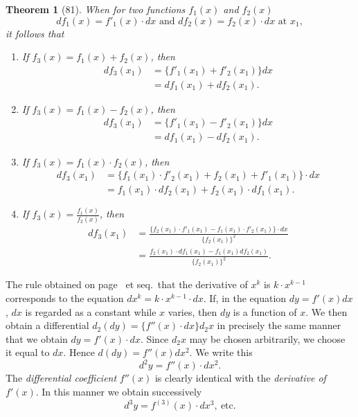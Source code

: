 \documentclass[a4paper,12pt]{book}[2004/02/16]
\providecommand{\hypertarget}[2]{#2}
\theoremstyle{ilemma}
\theoremstyle{itheorem}
\newtheorem{theorem}{Theorem}
\theoremstyle{iother}
\theoremstyle{icorollary}
\theoremstyle{numcorollary}
\theoremstyle{idefinition}
\renewcommand{\dfrac}[2]{\frac{#1}{#2}}%
\begin{document}
\begin{theorem}[81]\hypertarget{thm81}{}
When for two functions $f_1(x)$ and $f_2(x)$
\[
  df_1(x)=f'_1(x)\cdot dx\text{ and }df_2(x)=f_2(x)\cdot dx\text{ at }x_1,
\]
it follows that
\begin{enumerate}
\item[\textnormal{(\textit{a})}] If $f_3(x)=f_1(x)+f_2(x)$, then
\begin{align*}
  df_3(x_1)&=\{f'_1(x_1)+f'_2(x_1)\}dx \\
  &= df_1(x_1)+df_2(x_1).
\end{align*}
\item[\textnormal{(\textit{b})}] If $f_3(x)=f_1(x)-f_2(x)$, then
\begin{align*}
  df_3(x_1)&=\{f'_1(x_1)-f'_2(x_1)\}dx \\
  &= df_1(x_1)-df_2(x_1).
\end{align*}
\item[\textnormal{(\textit{c})}] If $f_3(x)=f_1(x) \cdot f_2(x)$, then
\begin{align*}
  df_3(x_1)&=\{f_1(x_1)\cdot f'_2(x_1) + f_2(x_1)+f'_1(x_1)\}\cdot dx
\\ &= f_1(x_1)\cdot df_2(x_1)+f_2(x_1)\cdot df_1(x_1).
\end{align*}
\item[\textnormal{(\textit{d})}] If $f_3(x)=\dfrac{f_1(x)}{f_2(x)}$, then
\begin{align*}
  df_3(x_1)&=\dfrac{\{f_2(x_1)\cdot f'_1(x_1)-f_1(x_1)\cdot f'_2(x_1)\}
\cdot dx}{\{f_2(x_1)\}^2} \\
  &= \dfrac{f_2(x_1)\cdot df_1(x_1)-f_1(x_1)df_2(x_1)}{\{f_2(x_1)\}^2}.
\end{align*}
\end{enumerate}
\end{theorem}
The rule obtained on page~\pageref{p122t76} et seq.\ that the derivative of $x^k$ is
$k \cdot x^{k-1}$ corresponds to the equation $dx^k=k\cdot
x^{k-1}\cdot dx$. If, in the
equation $dy=f'(x)dx$, $dx$ is regarded as a constant while $x$
varies, then $dy$ is a function of $x$. We then obtain a differential
$d_2(dy) = \{f''(x)\cdot dx\}d_2x$ in precisely the same manner that
we obtain $dy=f'(x)\cdot dx$. Since $d_2x$ may be chosen arbitrarily,
we choose it equal to $dx$. Hence $d(dy) =f''(x)dx^2$. We write this
\[
  d^2y=f''(x)\cdot dx^2.
\]
The \textit{differential coefficient} $f''(x)$ is clearly identical
with the \textit{derivative of} $f'(x)$. In this manner we obtain
successively
\[
  d^3y=f^{(3)}(x)\cdot dx^3,\ \text{etc.}
\]
\end{document}
